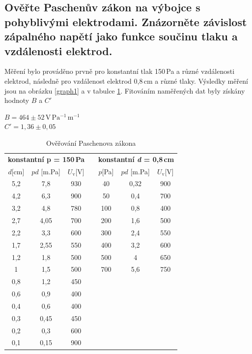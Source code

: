 \documentclass[12pt]{article}
\begin{document}
\subsection{Ověřte Paschenův zákon na výbojce s pohyblivými elektrodami. Znázorněte závislost zápalného napětí jako funkce součinu tlaku a vzdálenosti elektrod.}
Měření bylo prováděno prvně pro konstantní tlak 150\,Pa a různé vzdálenosti elektrod, následně pro vzdálenost elektrod 0,8\,cm a různé tlaky. Výsledky měření jsou na obrázku \ref{graph1} a v tabulce \ref{paschentable}. Fitováním naměřených dat byly získány hodnoty $B$ a $C'$
\begin{center}
$B = 464\pm 52\,\mathrm{V\,Pa^{-1}\,m^{-1}}$\\
$C' = 1,36 \pm 0,05 $
\end{center}

\begin{table}[htbp]
\begin{center}
\begin{tabular}{ccccccc}
\multicolumn{3}{c}{\textbf{konstantní p = 150\,Pa}} &  & \multicolumn{3}{c}{\textbf{konstantní \emph{d} = 0,8\,cm}} \\
$d$[cm] & $p d$ [m.Pa]& $U_\mathrm{v}$[V] &  & $p$[Pa] & $p d$ [m.Pa] & $U_\mathrm{v}$[V] \\
5,2 & 7,8 & 930 &  & 40 & 0,32 & 900 \\
4,2 & 6,3 & 900 &  & 50 & 0,4 & 700 \\
3,2 & 4,8 & 780 &  & 100 & 0,8 & 400 \\
2,7 & 4,05 & 700 &  & 200 & 1,6 & 500 \\
2,2 & 3,3 & 600 &  & 300 & 2,4 & 550 \\
1,7 & 2,55 & 550 &  & 400 & 3,2 & 600 \\
1,2 & 1,8 & 500 &  & 500 & 4 & 650 \\
1 & 1,5 & 500 &  & 700 & 5,6 & 750 \\
0,8 & 1,2 & 450 &  \multicolumn{4}{l}{} \\
0,6 & 0,9 & 400 &  \multicolumn{4}{l}{} \\
0,4 & 0,6 & 400 &   \multicolumn{4}{l}{} \\
0,3 & 0,45 & 450 &  \multicolumn{4}{l}{} \\
0,2 & 0,3 & 600 &  \multicolumn{4}{l}{} \\
0,1 & 0,15 & 900 &   \multicolumn{4}{l}{} \\
\end{tabular}
\caption{Ověřování Paschenova zákona}
\label{paschentable}
\end{center}
\end{table}
\end{document}
